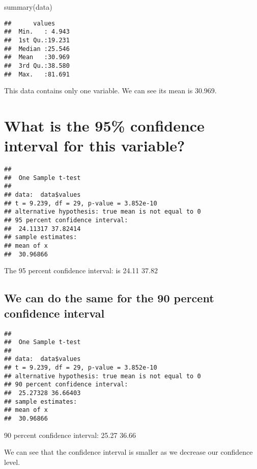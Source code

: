 \documentclass[
]{article}
\newenvironment{Shaded}{\begin{snugshade}}{\end{snugshade}}
\newcommand{\AttributeTok}[1]{\textcolor[rgb]{0.77,0.63,0.00}{#1}}
\newcommand{\FloatTok}[1]{\textcolor[rgb]{0.00,0.00,0.81}{#1}}
\newcommand{\FunctionTok}[1]{\textcolor[rgb]{0.00,0.00,0.00}{#1}}
\newcommand{\NormalTok}[1]{#1}
\newcommand{\SpecialCharTok}[1]{\textcolor[rgb]{0.00,0.00,0.00}{#1}}
\begin{document}
\begin{Shaded}
\begin{Highlighting}[]
\FunctionTok{summary}\NormalTok{(data)}
\end{Highlighting}
\end{Shaded}

\begin{verbatim}
##      values      
##  Min.   : 4.943  
##  1st Qu.:19.231  
##  Median :25.546  
##  Mean   :30.969  
##  3rd Qu.:38.580  
##  Max.   :81.691
\end{verbatim}

This data contains only one variable. We can see its mean is 30.969.

\hypertarget{what-is-the-95-confidence-interval-for-this-variable}{%
\section{What is the 95\% confidence interval for this
variable?}\label{what-is-the-95-confidence-interval-for-this-variable}}

\begin{Shaded}
\end{Shaded}

\begin{verbatim}
## 
##  One Sample t-test
## 
## data:  data$values
## t = 9.239, df = 29, p-value = 3.852e-10
## alternative hypothesis: true mean is not equal to 0
## 95 percent confidence interval:
##  24.11317 37.82414
## sample estimates:
## mean of x 
##  30.96866
\end{verbatim}

The 95 percent confidence interval: is 24.11 37.82

\hypertarget{we-can-do-the-same-for-the-90-percent-confidence-interval}{%
\subsection{We can do the same for the 90 percent confidence
interval}\label{we-can-do-the-same-for-the-90-percent-confidence-interval}}

\begin{Shaded}
\end{Shaded}

\begin{verbatim}
## 
##  One Sample t-test
## 
## data:  data$values
## t = 9.239, df = 29, p-value = 3.852e-10
## alternative hypothesis: true mean is not equal to 0
## 90 percent confidence interval:
##  25.27328 36.66403
## sample estimates:
## mean of x 
##  30.96866
\end{verbatim}

90 percent confidence interval: 25.27 36.66

We can see that the confidence interval is smaller as we decrease our
confidence level.
\end{document}
